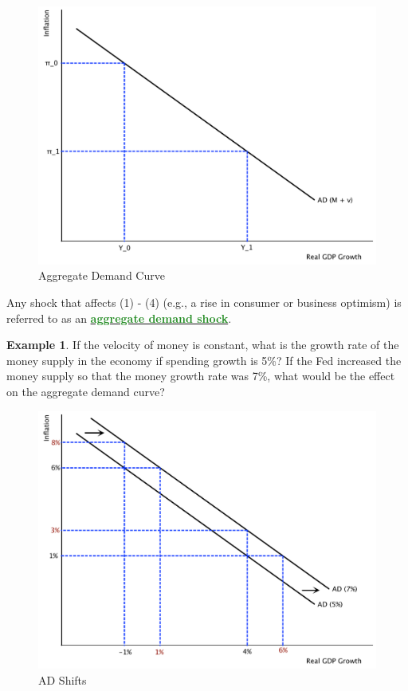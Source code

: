 \documentclass[11pt]{article}\usepackage[]{graphicx}\usepackage[]{color}
\theoremstyle{definition}
\newtheorem{exmp}{Example}[section]
\newcommand{\dd}[1]{{\underline{\textbf{\textcolor{ForestGreen}{#1}}}}}
\begin{document}
	\begin{figure}[H]
		\centering
		\includegraphics[scale=.40]{plot95.pdf}
		\caption{Aggregate Demand Curve}
	\end{figure}

Any shock that affects (1) - (4) (e.g., a rise in consumer or business optimism) is referred to as an \dd{aggregate demand shock}.
\\

\begin{exmp}
If the velocity of money is constant, what is the growth rate of the money supply in the economy if spending growth is 5\%? If the Fed increased the money supply so that the money growth rate was 7\%, what would be the effect on the aggregate demand curve?
\end{exmp} 

\begin{figure}[H]
	\centering
	\includegraphics[scale=.40]{plot96.pdf}
	\caption{AD Shifts}
\end{figure}
\end{document}
